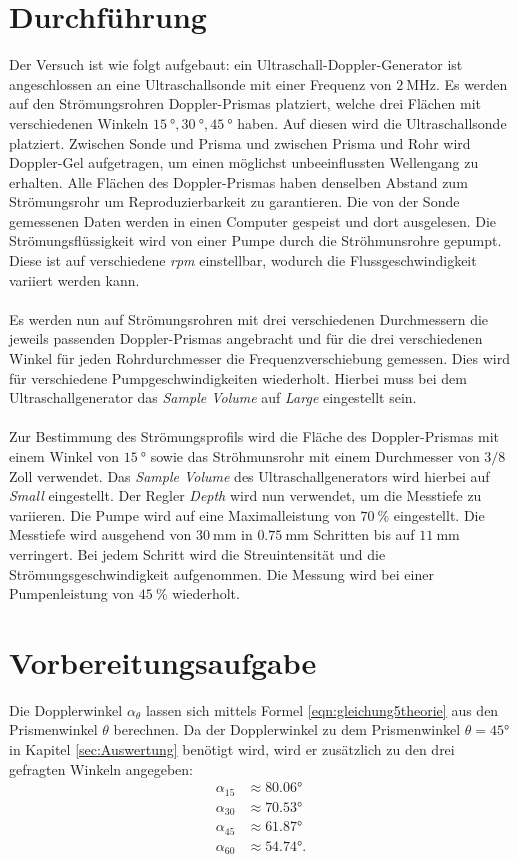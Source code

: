 \section{Durchführung}
\label{sec:Durchführung}

Der Versuch ist wie folgt aufgebaut: ein Ultraschall-Doppler-Generator ist
angeschlossen an eine
Ultraschallsonde mit einer Frequenz von $\SI{2}{\mega\hertz}$. Es werden auf den
Strömungsrohren Doppler-Prismas platziert, welche drei Flächen mit verschiedenen
Winkeln $\SI{15}{\degree}, \SI{30}{\degree}, \SI{45}{\degree}$ haben. Auf diesen
wird die Ultraschallsonde platziert. Zwischen Sonde und Prisma und zwischen Prisma
und Rohr wird Doppler-Gel aufgetragen, um einen möglichst unbeeinflussten
Wellengang zu erhalten. Alle Flächen des Doppler-Prismas haben denselben Abstand zum
Strömungsrohr um Reproduzierbarkeit zu garantieren.
Die von der Sonde gemessenen Daten werden in einen Computer gespeist und dort
ausgelesen. Die Strömungsflüssigkeit wird von einer Pumpe durch die Ströhmunsrohre
gepumpt. Diese ist auf verschiedene \textit{rpm} einstellbar, wodurch die
Flussgeschwindigkeit variiert werden kann. \\
\\
Es werden nun auf Strömungsrohren mit drei verschiedenen Durchmessern die
jeweils passenden Doppler-Prismas angebracht und für die drei verschiedenen
Winkel für jeden Rohrdurchmesser die Frequenzverschiebung gemessen. Dies wird
für verschiedene Pumpgeschwindigkeiten wiederholt. Hierbei muss bei dem
Ultraschallgenerator das \textit{Sample Volume} auf \textit{Large} eingestellt sein.\\
\\
Zur Bestimmung des Strömungsprofils wird die Fläche des Doppler-Prismas
mit einem Winkel von $\SI{15}{\degree}$ sowie das Ströhmunsrohr mit einem Durchmesser
von $3/8$ Zoll verwendet. Das \textit{Sample Volume} des Ultraschallgenerators
wird hierbei auf \textit{Small} eingestellt. Der Regler \textit{Depth} wird nun
verwendet, um die Messtiefe zu variieren. Die Pumpe wird auf eine Maximalleistung
von $\SI{70}{\percent}$ eingestellt. Die Messtiefe wird ausgehend von $\SI{30}{\milli\meter}$
in $\SI{0.75}{\milli\meter}$ Schritten bis auf $\SI{11}{\milli\meter}$ verringert.
Bei jedem Schritt wird die Streuintensität und die Strömungsgeschwindigkeit aufgenommen.
Die Messung wird bei einer Pumpenleistung von $\SI{45}{\percent}$ wiederholt.

\section{Vorbereitungsaufgabe}
\label{sec:vorbereitung}
Die Dopplerwinkel $\alpha_{\theta}$ lassen sich mittels Formel \eqref{eqn:gleichung5theorie} aus
den Prismenwinkel
$\theta$ berechnen. Da der Dopplerwinkel zu dem
Prismenwinkel $\theta=45°$ in Kapitel \ref{sec:Auswertung} benötigt wird, wird er
zusätzlich zu den drei gefragten Winkeln angegeben:
\begin{align*}
\alpha_{15}&\approx 80.06°\\
\alpha_{30}&\approx 70.53°\\
\alpha_{45}&\approx 61.87°\\
\alpha_{60}&\approx 54.74°  .
\end{align*}
